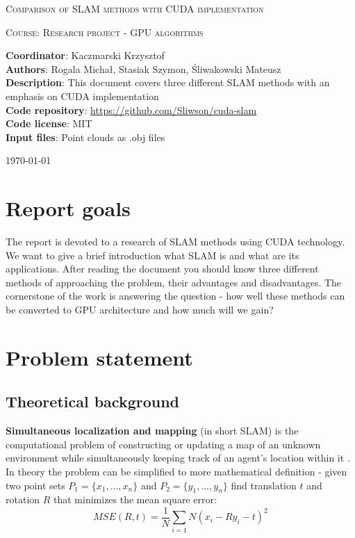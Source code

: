 \documentclass[titlepage]{article}
\begin{document}
\begin{titlepage}
	{\centering
	{\scshape\huge Comparison of SLAM methods with CUDA implementation \par}
	\vspace{1cm}
	{\scshape\Large Course: Research project - GPU algorithms \par}}
	
	\vspace{1cm}
	\noindent\textbf{Coordinator}: Kaczmarski Krzysztof\\
	\textbf{Authors}: Rogala Michał, Stasiak Szymon, Śliwakowski Mateusz\\
	\textbf{Description}: This document covers three different SLAM methods with an emphasis on CUDA \mbox{implementation}\\
	\textbf{Code repository}: \href{https://github.com/Sliwson/cuda-slam}{https://github.com/Sliwson/cuda-slam}\\
	\textbf{Code license}: MIT\\
	\textbf{Input files}: Point clouds as .obj files\\

	\vfill
	{\large \today \par}
\end{titlepage}

\tableofcontents
\newpage

\section{Report goals}

The report is devoted to a research of SLAM methods using CUDA technology. We want to give a brief introduction what SLAM is and what are its applications. After reading the document you should know three different methods of approaching the problem, their advantages and disadvantages. The cornerstone of the work is answering the question - how well these methods can be converted to GPU architecture and how much will we gain?

\section{Problem statement}

\subsection{Theoretical background}
\textbf{Simultaneous localization and mapping} (in short SLAM) is the computational problem of constructing or updating a map of an unknown environment while simultaneously keeping track of an agent's location within it \cite{ms-wiki1}. In theory the problem can be simplified to more mathematical definition - given two point sets $P_1 = \{x_1,\dots, x_n\}$ and $P_2=\{y_1, \dots, y_n\}$ find translation $t$ and rotation $R$ that minimizes the mean square error:
$$MSE(R, t) = \frac{1}{N}\sum_{i=1}{N}(x_i - Ry_i - t)^2$$
\end{document}
